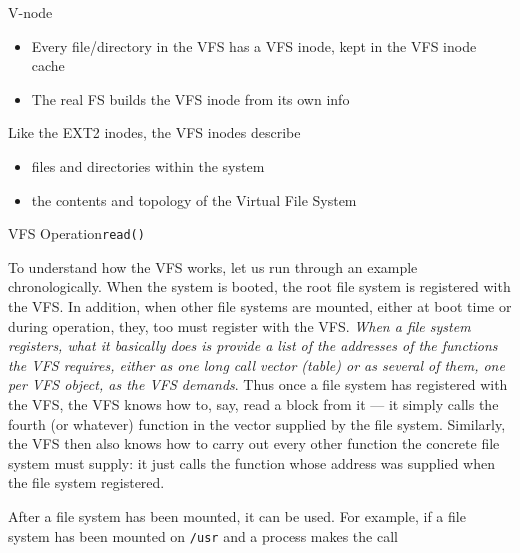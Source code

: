 \begin{frame}{V-node}
  \begin{itemize}
  \item Every file/directory in the VFS has a VFS inode, kept in the VFS \alert{inode
      cache}
  \item The real FS builds the VFS inode from its own info
  \end{itemize}
  \begin{block}{Like the EXT2 inodes, the VFS inodes describe}
    \begin{itemize}
    \item files and directories within the system
    \item the contents and topology of the Virtual File System
    \end{itemize}
  \end{block}
\end{frame}

\begin{frame}{VFS Operation}{\texttt{read()}}
  \label{fig:vfs2}%
  \centering%
  \mode<beamer>{ \texttt{[image: mos-04-19]} }%
\end{frame}

To understand how the VFS works, let us run through an example chronologically. When the
system is booted, the root file system is registered with the VFS.  In addition, when
other file systems are mounted, either at boot time or during operation, they, too must
register with the VFS. \emph{When a file system registers, what it basically does is provide
  a list of the addresses of the functions the VFS requires, either as one long call
  vector (table) or as several of them, one per VFS object, as the VFS demands}. Thus once
a file system has registered with the VFS, the VFS knows how to, say, read a block from it
--- it simply calls the fourth (or whatever) function in the vector supplied by the file
system. Similarly, the VFS then also knows how to carry out every other function the
concrete file system must supply: it just calls the function whose address was supplied
when the file system registered.

After a file system has been mounted, it can be used. For example, if a file system has
been mounted on \texttt{/usr} and a process makes the call

